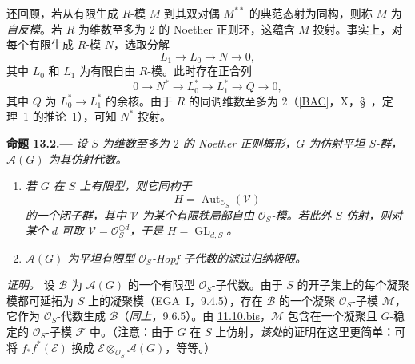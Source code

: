 还回顾，若从有限生成 \(R\)-模 \(M\) 到其双对偶 \(M^{**}\) 的典范态射为同构，则称 \(M\) 为\emph{自反模}。若 \(R\) 为维数至多为 \(2\) 的 Noether 正则环，这蕴含 \(M\) 投射。事实上，对每个有限生成 \(R\)-模 \(N\)，选取分解
\[
  L_1\longrightarrow L_0\longrightarrow N\longrightarrow0,
\]
其中 \(L_0\) 和 \(L_1\) 为有限自由 \(R\)-模。此时存在正合列
\label{seq:sga3-VIB-13.1-dual-resolution}%
\[
  0\longrightarrow N^*
    \longrightarrow L_0^*
    \longrightarrow L_1^*
    \longrightarrow Q
    \longrightarrow0,
\]
其中 \(Q\) 为 \(L_0^*\to L_1^*\) 的余核。由于 \(R\) 的同调维数至多为 \(2\)\textup{（\hyperref[bib:sga3-VIB-BAC]{[BAC]}，X，\S~，定理~1 的推论~1）}，可知 \(N^*\) 投射。

\medskip
{}\label{prop:sga3-VIB-13.2}%
\noindent\textbf{命题 13.2.---}
\emph{设 \(S\) 为维数至多为 \(2\) 的 Noether 正则概形，\(G\) 为仿射平坦 \(S\)-群，\(\mathcal A(G)\) 为其仿射代数。}
\begin{enumerate}
\item[\textup{(i)}]\label{concl:sga3-VIB-13.2-i}
  \emph{若 \(G\) 在 \(S\) 上有限型，则它同构于}
\[
    H=\operatorname{Aut}_{\mathcal O_S}(\mathcal V)
  \]
  \emph{的一个闭子群，其中 \(\mathcal V\) 为某个有限秩局部自由 \(\mathcal O_S\)-模。若此外 \(S\) 仿射，则对某个 \(d\) 可取 \(\mathcal V=\mathcal O_S^{\oplus d}\)，于是 \(H=\operatorname{GL}_{d,S}\)。}

\item[\textup{(ii)}]\label{concl:sga3-VIB-13.2-ii}
  \emph{\(\mathcal A(G)\) 为平坦有限型 \(\mathcal O_S\)-Hopf 子代数的滤过归纳极限。}
\end{enumerate}

\emph{证明。}
设 \(\mathcal B\) 为 \(\mathcal A(G)\) 的一个有限型 \(\mathcal O_S\)-子代数。由于 \(S\) 的开子集上的每个凝聚模都可延拓为 \(S\) 上的凝聚模\textup{（EGA~I，9.4.5）}，存在 \(\mathcal B\) 的一个凝聚 \(\mathcal O_S\)-子模 \(\mathcal M\)，它作为 \(\mathcal O_S\)-代数生成 \(\mathcal B\)\textup{（\emph{同上}，9.6.5）}。由 \hyperref[prop:sga3-VIB-11.10.bis]{11.10.bis}，\(\mathcal M\) 包含在一个凝聚且 \(G\)-稳定的 \(\mathcal O_S\)-子模 \(\mathcal F\) 中。\textup{（注意：由于 \(G\) 在 \(S\) 上仿射，\emph{该处}的证明在这里更简单：可将 \(f_*f^*(\mathcal E)\) 换成 \(\mathcal E\otimes_{\mathcal O_S}\mathcal A(G)\)，等等。）}

